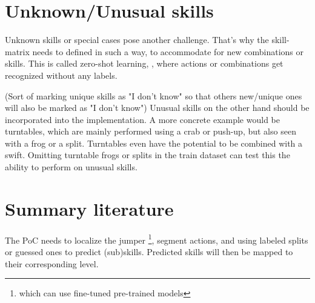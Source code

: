 \section{Unknown/Unusual skills}
\label{subsec:bp-literature-unknowmultin-unusual-skills}

Unknown skills or special cases pose another challenge. That's why the skill-matrix needs to defined in such a way, to accommodate for new combinations or skills. This is called zero-shot learning, \autocite{Pourpanah_2022}, where actions or combinations get recognized without any labels.

(Sort of marking unique skills as "I don't know" so that others new/unique ones will also be marked as "I don't know") Unusual skills on the other hand should be incorporated into the implementation.
A more concrete example would be turntables, which are mainly performed using a crab or push-up, but also seen with a frog or a split.
Turntables even have the potential to be combined with a swift. Omitting turntable frogs or splits in the train dataset can test this the ability to perform on unusual skills.




\section{Summary literature}
\label{subsec:bp-summary literature}

The PoC needs to localize the jumper \footnote{which can use fine-tuned pre-trained models}, segment actions, and using labeled splits or guessed ones to predict (sub)skills.
Predicted skills will then be mapped to their corresponding level.
